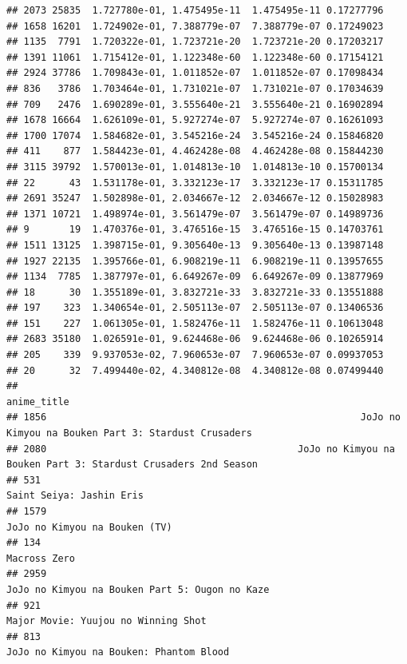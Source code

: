 \documentclass[
]{article}
\begin{document}
\begin{verbatim}
## 2073 25835  1.727780e-01, 1.475495e-11  1.475495e-11 0.17277796
## 1658 16201  1.724902e-01, 7.388779e-07  7.388779e-07 0.17249023
## 1135  7791  1.720322e-01, 1.723721e-20  1.723721e-20 0.17203217
## 1391 11061  1.715412e-01, 1.122348e-60  1.122348e-60 0.17154121
## 2924 37786  1.709843e-01, 1.011852e-07  1.011852e-07 0.17098434
## 836   3786  1.703464e-01, 1.731021e-07  1.731021e-07 0.17034639
## 709   2476  1.690289e-01, 3.555640e-21  3.555640e-21 0.16902894
## 1678 16664  1.626109e-01, 5.927274e-07  5.927274e-07 0.16261093
## 1700 17074  1.584682e-01, 3.545216e-24  3.545216e-24 0.15846820
## 411    877  1.584423e-01, 4.462428e-08  4.462428e-08 0.15844230
## 3115 39792  1.570013e-01, 1.014813e-10  1.014813e-10 0.15700134
## 22      43  1.531178e-01, 3.332123e-17  3.332123e-17 0.15311785
## 2691 35247  1.502898e-01, 2.034667e-12  2.034667e-12 0.15028983
## 1371 10721  1.498974e-01, 3.561479e-07  3.561479e-07 0.14989736
## 9       19  1.470376e-01, 3.476516e-15  3.476516e-15 0.14703761
## 1511 13125  1.398715e-01, 9.305640e-13  9.305640e-13 0.13987148
## 1927 22135  1.395766e-01, 6.908219e-11  6.908219e-11 0.13957655
## 1134  7785  1.387797e-01, 6.649267e-09  6.649267e-09 0.13877969
## 18      30  1.355189e-01, 3.832721e-33  3.832721e-33 0.13551888
## 197    323  1.340654e-01, 2.505113e-07  2.505113e-07 0.13406536
## 151    227  1.061305e-01, 1.582476e-11  1.582476e-11 0.10613048
## 2683 35180  1.026591e-01, 9.624468e-06  9.624468e-06 0.10265914
## 205    339  9.937053e-02, 7.960653e-07  7.960653e-07 0.09937053
## 20      32  7.499440e-02, 4.340812e-08  4.340812e-08 0.07499440
##                                                                                                    anime_title
## 1856                                                       JoJo no Kimyou na Bouken Part 3: Stardust Crusaders
## 2080                                            JoJo no Kimyou na Bouken Part 3: Stardust Crusaders 2nd Season
## 531                                                                                   Saint Seiya: Jashin Eris
## 1579                                                                             JoJo no Kimyou na Bouken (TV)
## 134                                                                                               Macross Zero
## 2959                                                            JoJo no Kimyou na Bouken Part 5: Ougon no Kaze
## 921                                                                        Major Movie: Yuujou no Winning Shot
## 813                                                                    JoJo no Kimyou na Bouken: Phantom Blood

\end{verbatim}
\end{document}
